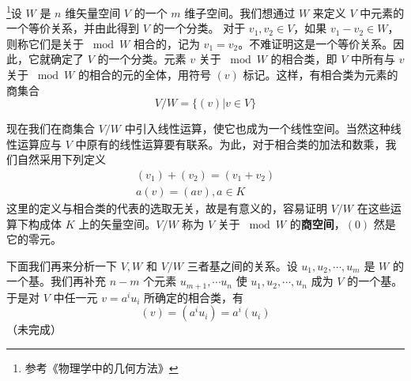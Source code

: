 

\footnote{参考《物理学中的几何方法》}设 $W$ 是 $n$ 维矢量空间 $V$ 的一个 $m$ 维子空间。我们想通过 $W$ 来定义 $V$ 中元素的一个等价关系，并由此得到 $V$ 的一个分类。
对于 $v_1,v_2\in V$，如果 $v_1-v_2\in W$，则称它们是关于 $\bmod W $ 相合的，记为 $v_1=v_2$。不难证明这是一个等价关系。因此，它就确定了 $V $ 的一个分类。元素 $v $ 关于 $\bmod W $ 的相合类，即 $V $ 中所有与 $v $ 关于 $\bmod W $ 的相合的元的全体，用符号 $(v) $ 标记。这样，有相合类为元素的商集合
\begin{equation}
V / W=\{(v) | v \in V\}
\end{equation}

现在我们在商集合 $V/W $ 中引入线性运算，使它也成为一个线性空间。当然这种线性运算应与 $V $ 中原有的线性运算要有联系。为此，对于相合类的加法和数乘，我们自然采用下列定义
\begin{equation}
\begin{array}{l}\left(v_{1}\right)+\left(v_{2}\right)=\left(v_{1}+v_{2}\right) \\ a(v)=(a v), a \in K\end{array}
\end{equation}
这里的定义与相合类的代表的选取无关，故是有意义的，容易证明 $V/W $ 在这些运算下构成体 $K $ 上的矢量空间。$V/W $ 称为 $V $ 关于 $\bmod W$ 的\textbf{商空间}，$(0)$ 然是它的零元。

下面我们再来分析一下 $V,W$ 和 $V/W $ 三者基之间的关系。设 $u_1,u_2,\cdots,u_m$ 是 $W $ 的一个基。我们再补充 $n- m$ 个元素 ${u}_{m+1}, \cdots {u}_{n}$ 使 $u_{1}, u_{2}, \cdots, u_{n}$ 成为 $V$ 的一个基。于是对 $V $ 中任一元 $v=a^iu_i$ 所确定的相合类，有
\begin{equation}
(v)=\left(a^{i} u_{i}\right)=a^{i}\left(u_{i}\right)
\end{equation}
（未完成）
